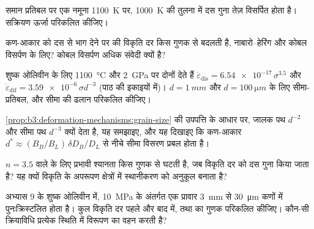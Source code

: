 \begin{exercise}[$\star\star$]\label{exo:b3:deformation-mechanisms:7}
समान प्रतिबल पर एक नमूना \qty{1100}{K} पर, \qty{1000}{K} की तुलना में
दस गुना तेज़ विसर्पित होता है। सक्रियण ऊर्जा परिकलित कीजिए।
\end{exercise}

\begin{exercise}[$\star\star$]\label{exo:b3:deformation-mechanisms:8}
कण-आकार को दस से भाग देने पर  की विकृति दर किस गुणक से
बदलती है, नाबारो--हेरिंग और कोबल विसर्पण के लिए? कोबल विसर्पण
अधिक संवेदी क्यों है?
\end{exercise}

\begin{exercise}[$\star\star$]\label{exo:b3:deformation-mechanisms:9}
शुष्क ओलिवीन के लिए \qty{1100}{\celsius} और \qty{2}{GPa} पर दोनों  देते हैं
$\dot\varepsilon_{\mathrm{dis}} = \num{6.54e-17}\,\sigma^{3.5}$ और
$\dot\varepsilon_{\mathrm{dif}} = \num{3.59e-6}\,\sigma d^{-3}$ (पाठ की
इकाइयों में)। $d = \qty{1}{mm}$ और $d =
\qty{100}{\micro m}$ के लिए सीमा-प्रतिबल, और सीमा की ढलान परिकलित कीजिए।
\end{exercise}

\begin{exercise}[$\star\star\star$]\label{exo:b3:deformation-mechanisms:10}
\cref{prop:b3:deformation-mechanisms:grain-size} की उपपत्ति के आधार पर,
जालक पथ $d^{-2}$ और सीमा पथ $d^{-3}$ क्यों देता है, यह समझाइए, और
यह दिखाइए कि कण-आकार $d^* \approx
(B_B/B_L)\,\delta D_B/D_L$ से नीचे सीमा विसरण प्रबल होता है।
\end{exercise}

\begin{exercise}[$\star\star\star$]\label{exo:b3:deformation-mechanisms:11}
$n = 3.5$ वाले  के लिए प्रभावी श्यानता किस गुणक से घटती है,
जब विकृति दर को दस गुना किया जाता है? यह क्यों
विकृति के अपरूपण क्षेत्रों में स्थानीकरण को अनुकूल बनाता है?
\end{exercise}

\begin{exercise}[$\star\star\star$]\label{exo:b3:deformation-mechanisms:12}
अभ्यास 9 के शुष्क ओलिवीन में, \qty{10}{MPa} के अंतर्गत एक प्रावार 
\qty{3}{mm} से \qty{30}{\micro m} कणों में पुनःक्रिस्टलित होता है। कुल
विकृति दर पहले और बाद में, तथा  का गुणक परिकलित कीजिए। कौन-सी
क्रियाविधि प्रत्येक स्थिति में विरूपण का वहन करती है?
\end{exercise}

